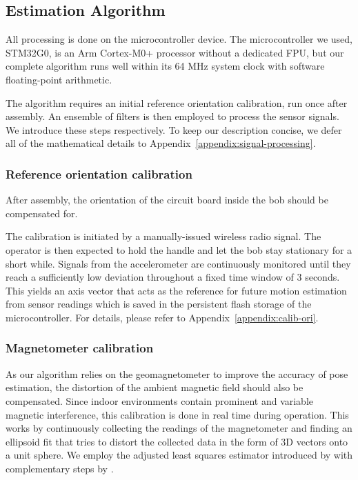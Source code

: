 \documentclass{nime-alternate} %
\begin{document}
\subsection{Estimation Algorithm}
All processing is done on the microcontroller device. The microcontroller we used, STM32G0, is an Arm Cortex-M0+ processor without a dedicated FPU, but our complete algorithm runs well within its 64 MHz system clock with software floating-point arithmetic.

The algorithm requires an initial reference orientation calibration, run once after assembly. An ensemble of filters is then employed to process the sensor signals. We introduce these steps respectively. To keep our description concise, we defer all of the mathematical details to Appendix~\ref{appendix:signal-processing}.

\subsubsection{Reference orientation calibration}
After assembly, the orientation of the circuit board inside the bob should be compensated for.

The calibration is initiated by a manually-issued wireless radio signal. The operator is then expected to hold the handle and let the bob stay stationary for a short while. Signals from the accelerometer are continuously monitored until they reach a sufficiently low deviation throughout a fixed time window of 3 seconds. This yields an axis vector that acts as the reference for future motion estimation from sensor readings which is saved in the persistent flash storage of the microcontroller. For details, please refer to Appendix~\ref{appendix:calib-ori}.

\subsubsection{Magnetometer calibration}
As our algorithm relies on the geomagnetometer to improve the accuracy of pose estimation, the distortion of the ambient magnetic field should also be compensated. Since indoor environments contain prominent and variable magnetic interference, this calibration is done in real time during operation. This works by continuously collecting the readings of the magnetometer and finding an ellipsoid fit that tries to distort the collected data in the form of 3D vectors onto a unit sphere. We employ the adjusted least squares estimator introduced by \cite{Markovsky_2004_ALS} with complementary steps by \cite{Renaudin2010}.
\end{document}
